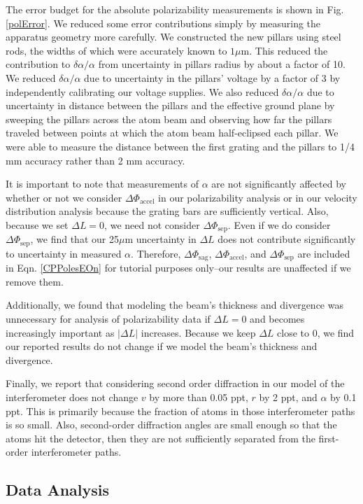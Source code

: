\documentclass[twocolumn,prl,showpacs,superscriptaddress]{revtex4-1}   %
\newcommand{\figref}[1]{Fig. \ref{#1}}
\newcommand{\eqnref}[1]{Eqn. \eqref{#1}}
\newcommand{\dphisep}{\Delta\Phi_{\mathrm{sep}}}
\newcommand{\dphisag}{\Delta\Phi_{\mathrm{sag}}}
\newcommand{\dphiaccel}{\Delta\Phi_{\mathrm{accel}}}
\begin{document}
The error budget for the absolute polarizability measurements is shown in \figref{polError}. We reduced some error contributions simply by measuring the apparatus geometry more carefully.
We constructed the new pillars using steel rods, the widths of which were accurately known to $1 \mu \text{m}$. This reduced the contribution to $\delta\alpha/\alpha$ from uncertainty in pillars radius by about a factor of 10.
We reduced $\delta\alpha/\alpha$ due to uncertainty in the pillars' voltage by a factor of 3 by independently calibrating our voltage supplies. We also reduced $\delta\alpha/\alpha$ due to uncertainty in distance between the pillars and the effective ground plane by sweeping the pillars across the atom beam and observing how far the pillars traveled between points at which the atom beam half-eclipsed each pillar. We were able to measure the distance between the first grating and the pillars to 1/4 mm accuracy rather than 2 mm accuracy. 

It is important to note that measurements of $\alpha$ are not significantly affected by whether or not we consider $\dphiaccel$ in our polarizability analysis or in our velocity distribution analysis because the grating bars are sufficiently vertical. 
Also, because we set $\Delta L = 0$, we need not consider $\dphisep$.
Even if we do consider $\dphisep$, we find that our 25$\mu$m uncertainty in $\Delta L$ does not contribute significantly to uncertainty in measured $\alpha$.
Therefore, $\dphisag$, $\dphiaccel$, and $\dphisep$ are included in \eqnref{CPPolesEOn} for tutorial purposes only--our results are unaffected if we remove them.

Additionally, we found that modeling the beam's thickness and divergence was unnecessary for analysis of polarizability data if $\Delta L = 0$ and becomes increasingly important as $|\Delta L|$ increases. Because we keep $\Delta L$ close to 0, we find our reported results do not change if we model the beam's thickness and divergence.

Finally, we report that considering second order diffraction in our model of the interferometer does not change $v$ by more than 0.05 ppt, $r$ by 2 ppt, and $\alpha$ by 0.1 ppt. This is primarily because the fraction of atoms in those interferometer paths is so small. Also, second-order diffraction angles are small enough so that the atoms hit the detector, then they are not sufficiently separated from the first-order interferometer paths.

\subsection{Data Analysis}
\end{document}

